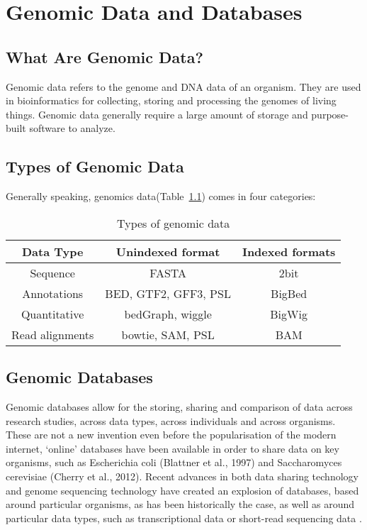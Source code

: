 \chapter{Genomic Data and Databases}\label{ch:ch2}

\section{What Are Genomic Data?}
Genomic data refers to the genome and DNA data of an organism. They are used in bioinformatics for collecting, storing and processing the genomes of living things. Genomic data generally require a large amount of storage and purpose-built software to analyze.


\section{Types of Genomic Data} 
Generally speaking, genomics data(Table~\ref{tab: data}) comes in four categories:

\begin{table}
	\centering
	\caption{Types of genomic data}
	\label{tab: data}
	\begin{tabular}{|c|c|c|}
		\hline 
		Data Type & Unindexed format & Indexed formats\\ \hline 
		
		Sequence & FASTA & 2bit\\ \hline 
		Annotations & BED, GTF2, GFF3, PSL & BigBed\\ \hline 
		Quantitative & bedGraph, wiggle & BigWig\\ \hline 
		Read alignments & bowtie, SAM, PSL & BAM\\ \hline 
		
	\end{tabular} 
\end{table}


\section{Genomic Databases}
Genomic databases allow for the storing, sharing and comparison of data across research studies, across data types, across individuals and across organisms. These are not a new invention even before the popularisation of the modern internet, ‘online’ databases have been available in order to share data on key organisms, such as Escherichia coli (Blattner et al., 1997) and Saccharomyces cerevisiae (Cherry et al., 2012). Recent advances in both data sharing technology and genome sequencing technology have created an explosion of databases, based around particular organisms, as has been historically the case, as well as around particular data types, such as transcriptional data or short-read sequencing data \cite{gutierrez2019genome}. 

